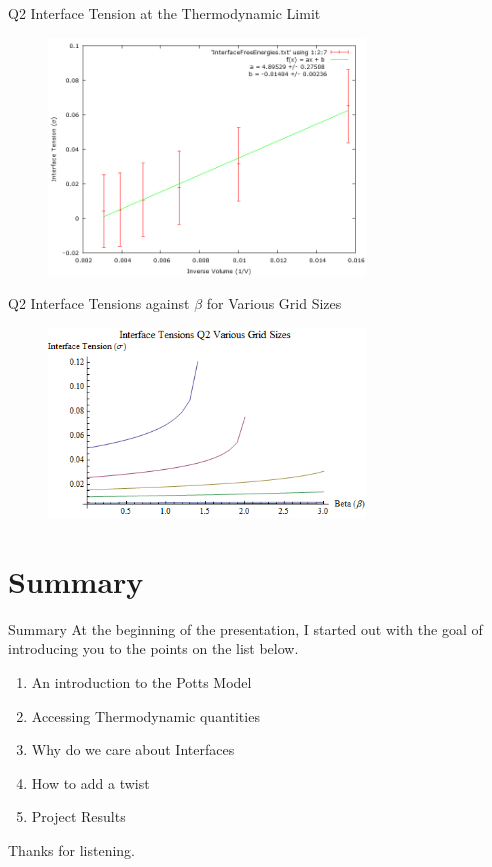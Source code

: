 \documentclass[12pt]{beamer}
\begin{document}
\begin{frame}{Q2 Interface Tension at the Thermodynamic Limit}

\begin{figure}
\centering
\includegraphics[width=0.75\textwidth]{Q2-InterfaceTension.png}
\end{figure}

\end{frame}


\begin{frame}{Q2 Interface Tensions against $\beta$ for Various Grid Sizes}

\begin{figure}
\centering
\includegraphics[width=0.75\textwidth]{Q2VariousGridSizesTensions.png}
\end{figure}
\end{frame}

\section{Summary}
\begin{frame}{Summary}
At the beginning of the presentation, I started out with the goal of introducing you to the points on the list below.
\begin{enumerate}
	\item An introduction to the Potts Model
	\item Accessing Thermodynamic quantities
	\item Why do we care about Interfaces
	\item How to add a twist
	\item Project Results
\end{enumerate}

\begin{center}
\large{Thanks for listening.}
\end{center}
\end{frame}
\end{document}
